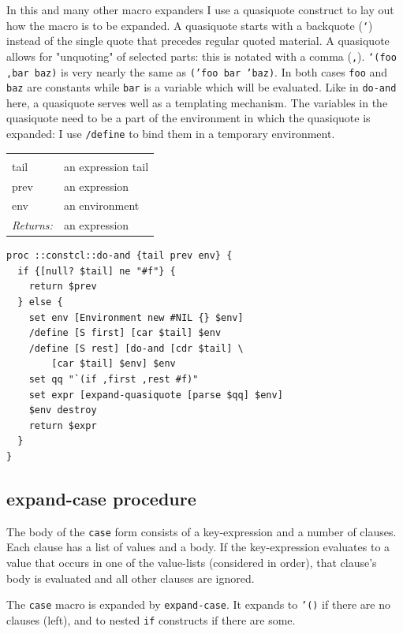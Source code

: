 \documentclass[twoside,9pt]{report}
\begin{document}
In this and many other macro expanders I use a quasiquote construct to lay out how the macro is to be expanded. A quasiquote starts with a backquote (\texttt{`}) instead of the single quote that precedes regular quoted material. A quasiquote allows for "unquoting" of selected parts: this is notated with a comma (\texttt{,}). \texttt{`(foo ,bar baz)} is very nearly the same as \texttt{('foo bar 'baz)}. In both cases \texttt{foo} and \texttt{baz} are constants while \texttt{bar} is a variable which will be evaluated. Like in \texttt{do-and} here, a quasiquote serves well as a templating mechanism. The variables in the quasiquote need to be a part of the environment in which the quasiquote is expanded: I use \texttt{/define} to bind them in a temporary environment.

\noindent\begin{tabular}{ |p{1.5cm} p{8cm}| }
\hline
\rowcolor[HTML]{CCCCCC} \multicolumn{2}{|l|}{\bf do-and (internal)} \\
tail & an expression tail \\
prev & an expression \\
env & an environment \\
\textit{Returns:} & an expression \\
\hline
\end{tabular}
\begin{lstlisting}
proc ::constcl::do-and {tail prev env} {
  if {[null? $tail] ne "#f"} {
    return $prev
  } else {
    set env [Environment new #NIL {} $env]
    /define [S first] [car $tail] $env
    /define [S rest] [do-and [cdr $tail] \
        [car $tail] $env] $env
    set qq "`(if ,first ,rest #f)"
    set expr [expand-quasiquote [parse $qq] $env]
    $env destroy
    return $expr
  }
}
\end{lstlisting}
\subsection{expand-case procedure}
\label{expand-case-procedure}


The body of the \texttt{case} form consists of a key-expression and a number of clauses. Each clause has a list of values and a body. If the key-expression evaluates to a value that occurs in one of the value-lists (considered in order), that clause's body is evaluated and all other clauses are ignored.


The \texttt{case} macro is expanded by \texttt{expand-case}. It expands to \texttt{'()} if there are no clauses (left), and to nested \texttt{if} constructs if there are some.
\end{document}
